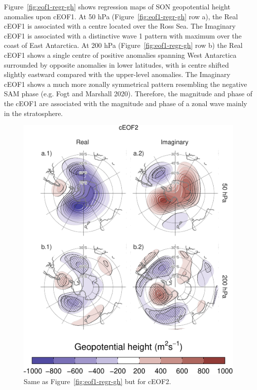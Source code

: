 \documentclass[smallextended]{svjour3}       %
\begin{document}
Figure~\ref{fig:eof1-regr-gh} shows regression maps of SON geopotential height anomalies upon cEOF1.
At 50 hPa (Figure~\ref{fig:eof1-regr-gh} row a), the Real cEOF1 is associated with a centre located over the Ross Sea.
The Imaginary cEOF1 is associated with a distinctive wave 1 pattern with maximum over the coast of East Antarctica.
At 200 hPa (Figure~\ref{fig:eof1-regr-gh} row b) the Real cEOF1 shows a single centre of positive anomalies spanning West Antarctica surrounded by opposite anomalies in lower latitudes, with is centre shifted slightly eastward compared with the upper-level anomalies.
The Imaginary cEOF1 shows a much more zonally symmetrical pattern resembling the negative SAM phase (e.g. Fogt and Marshall 2020).
Therefore, the magnitude and phase of the cEOF1 are associated with the magnitude and phase of a zonal wave mainly in the stratosphere.



\begin{figure}
\centering
\includegraphics{../figures/eof2-regr-gh-1.pdf}
\caption{\label{fig:eof2-regr-gh}Same as Figure~\ref{fig:eof1-regr-gh} but for cEOF2.}
\end{figure}
\end{document}
